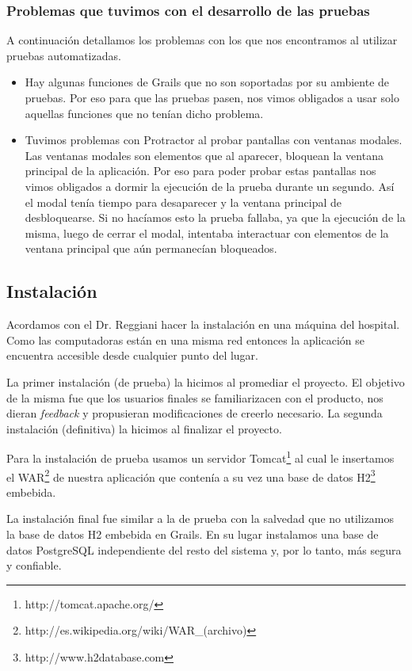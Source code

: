 \subsubsection{Problemas que tuvimos con el desarrollo de las pruebas}
A continuación detallamos los problemas con los que nos encontramos al utilizar pruebas automatizadas.
\begin{itemize}
\item Hay algunas funciones de Grails que no son soportadas por su ambiente de pruebas. Por eso para que las pruebas pasen, nos vimos obligados a usar solo aquellas funciones que no tenían dicho problema.
\item Tuvimos problemas con Protractor al probar pantallas con ventanas modales. Las ventanas modales son elementos que al aparecer, bloquean la ventana principal de la aplicación. Por eso para poder probar estas pantallas nos vimos obligados a dormir la ejecución de la prueba durante un segundo. Así el modal tenía tiempo para desaparecer y la ventana principal de desbloquearse. Si no hacíamos esto la prueba fallaba, ya que la ejecución de la misma, luego de cerrar el modal, intentaba interactuar con elementos de la ventana principal que aún permanecían bloqueados.
\end{itemize}

\subsection{Instalación}
Acordamos con el Dr. Reggiani hacer la instalación en una máquina del hospital. Como las computadoras están en una misma red entonces la aplicación se encuentra accesible desde cualquier punto del lugar.

La primer instalación (de prueba) la hicimos al promediar el proyecto. El objetivo de la misma fue que los usuarios finales se familiarizacen con el producto, nos dieran \textit{feedback} y propusieran modificaciones de creerlo necesario. La segunda instalación (definitiva) la hicimos al finalizar el proyecto.

Para la instalación de prueba usamos un servidor Tomcat\footnote{http://tomcat.apache.org/} al cual le insertamos el WAR\footnote{http://es.wikipedia.org/wiki/WAR\_(archivo)} de nuestra aplicación que contenía a su vez una base de datos H2\footnote{http://www.h2database.com} embebida.

La instalación final fue similar a la de prueba con la salvedad que no utilizamos la base de datos H2 embebida en Grails. En su lugar instalamos una base de datos PostgreSQL independiente del resto del sistema y, por lo tanto, más segura y confiable.